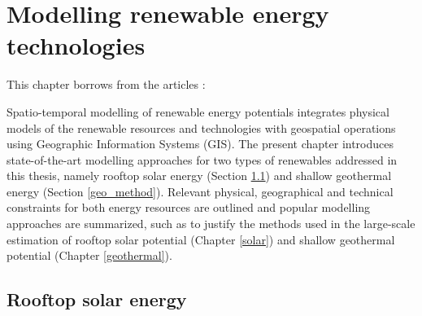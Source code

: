 
\chapter{Modelling renewable energy technologies}
\label{methods_physical}

\vspace{-15pt} %
\begin{tcolorbox}[enhanced,width=\textwidth,size=fbox,
        sharp corners,colframe=black!5!white,drop fuzzy shadow southeast,
        boxrule=3mm, parbox=false] 
        
This chapter borrows from the articles \citep{walch_big_2020,walch_quantifying_2021}:

\qquad {}

\qquad {}
\end{tcolorbox}

Spatio-temporal modelling of renewable energy potentials integrates physical models of the renewable resources and technologies with geospatial operations using Geographic Information Systems (GIS).
The present chapter introduces state-of-the-art modelling approaches for two types of renewables addressed in this thesis, namely rooftop solar energy (Section \ref{method_solar}) and shallow geothermal energy (Section \ref{geo_method}). 
Relevant physical, geographical and technical constraints for both energy resources are outlined and popular modelling approaches are summarized, such as to justify the methods used in the large-scale estimation of rooftop solar potential (Chapter \ref{solar}) and shallow geothermal potential (Chapter \ref{geothermal}).

\section{Rooftop solar energy}
\label{method_solar}
\label{method_solar_hierarchy}

